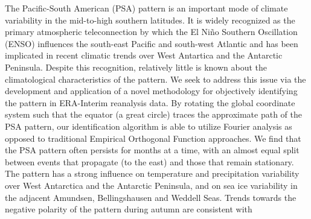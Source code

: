 The Pacific-South American (PSA) pattern is an important mode of climate variability in the mid-to-high southern latitudes. It is widely recognized as the primary atmospheric teleconnection by which the El Ni\~{n}o Southern Oscillation (ENSO) influences the south-east Pacific and south-west Atlantic and has been implicated in recent climatic trends over West Antartica and the Antarctic Peninsula. Despite this recognition, relatively little is known about the climatological characteristics of the pattern. We seek to address this issue via the development and application of a novel methodology for objectively identifying the pattern in ERA-Interim reanalysis data. By rotating the global coordinate system such that the equator (a great circle) traces the approximate path of the PSA pattern, our identification algorithm is able to utilize Fourier analysis as opposed to traditional Empirical Orthogonal Function approaches. We find that the PSA pattern often persists for months at a time, with an almost equal split between events that propagate (to the east) and those that remain stationary. The pattern has a strong influence on temperature and precipitation variability over West Antarctica and the Antarctic Peninsula, and on sea ice variability in the adjacent Amundsen, Bellingshausen and Weddell Seas. Trends towards the negative polarity of the pattern during autumn are consistent with  
